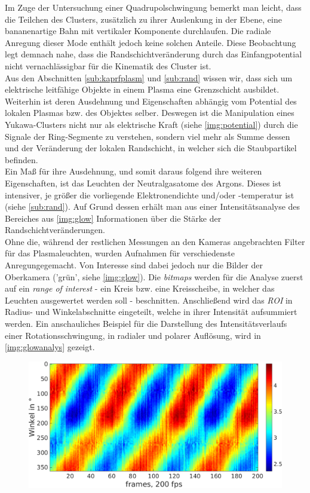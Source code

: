 \documentclass[numbers=noenddot,a4paper]{scrartcl}
\newcommand{\tilt}[1]{\textit{#1}}
\begin{document}
		Im Zuge der Untersuchung einer Quadrupolschwingung bemerkt man leicht, dass die Teilchen des Clusters, zusätzlich zu ihrer Auslenkung in der Ebene, eine bananenartige Bahn mit vertikaler Komponente durchlaufen. Die radiale Anregung dieser Mode enthält jedoch keine solchen Anteile. Diese Beobachtung legt demnach nahe, dass die Randschichtveränderung durch das Einfangpotential nicht vernachlässigbar für die Kinematik des Cluster ist.\\
		Aus den Abschnitten \ref{sub:kaprfplasm} und \ref{sub:rand} wissen wir,  dass sich um elektrische leitfähige Objekte in einem Plasma eine Grenzschicht ausbildet. Weiterhin ist deren Ausdehnung und Eigenschaften abhängig vom Potential des lokalen Plasmas bzw. des Objektes selber. Deswegen ist die Manipulation eines Yukawa-Clusters nicht nur als elektrische Kraft (siehe \ref{img:potential}) durch die Signale der Ring-Segmente zu verstehen, sondern viel mehr als Summe dessen und der Veränderung der lokalen Randschicht, in welcher sich die Staubpartikel befinden.\\
		Ein Maß für ihre Ausdehnung, und somit daraus folgend ihre weiteren Eigenschaften, ist das Leuchten der Neutralgasatome des Argons. Dieses ist intensiver, je größer die vorliegende Elektronendichte und/oder -temperatur ist (siehe \ref{sub:rand}).  Auf Grund dessen erhält man aus einer Intensitätsanalyse des Bereiches aus \ref{img:glow} Informationen über die Stärke der Randschichtveränderungen.\\
        Ohne die, während der restlichen Messungen an den Kameras angebrachten Filter für das Plasmaleuchten, wurden Aufnahmen für verschiedenste Anregungegemacht. Von Interesse sind dabei jedoch nur die Bilder der Oberkamera ('grün', siehe \ref{img:glow}). Die \tilt{bitmaps} werden für die Analyse zuerst auf ein \tilt{range of interest} - ein Kreis bzw. eine Kreisscheibe, in welcher das Leuchten ausgewertet werden soll - beschnitten. Anschließend wird das \tilt{ROI} in Radius- und Winkelabschnitte eingeteilt, welche in ihrer Intensität aufsummiert werden. Ein anschauliches Beispiel für die Darstellung des Intensitätsverlaufs einer Rotationsschwingung, in radialer und polarer Auflösung, wird in \ref{img:glowanalys} gezeigt.

            \begin{figure}[H]
                    \centering
                    \includegraphics[width=\textwidth,height=0.3\textheight]{figs/glowbeispielrotation3Hzang.png}
            \end{figure}
\end{document}
